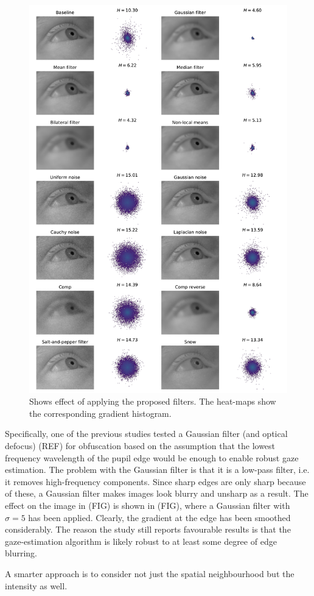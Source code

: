 \begin{figure}
    \centering
    \includegraphics[width=1\linewidth]{figures/filter_effect.pdf}
    \caption{Shows effect of applying the proposed filters. The heat-maps show the corresponding gradient histogram.}
    \label{fig:filters}
\end{figure}
Specifically, one of the previous studies tested a Gaussian filter (and optical defocus) (REF) for obfuscation based on the assumption that the lowest frequency wavelength of the pupil edge would be enough to enable robust gaze estimation. The problem with the Gaussian filter is that it is a low-pass filter, i.e. it removes high-frequency components. Since sharp edges are only sharp because of these, a Gaussian filter makes images look blurry and unsharp as a result. The effect on the image in (FIG) is shown in (FIG), where a Gaussian filter with $\sigma=5$ has been applied. Clearly, the gradient at the edge has been smoothed considerably. The reason the study still reports favourable results is that the gaze-estimation algorithm is likely robust to at least some degree of edge blurring.

A smarter approach is to consider not just the spatial neighbourhood but the intensity as well. 